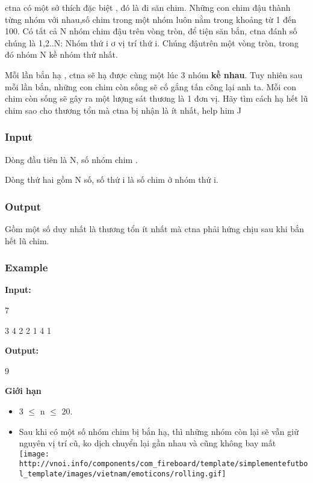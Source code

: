 

ctna có một sở thích đặc biệt , đó là đi săn chim. Những con chim đậu thành từng nhóm với nhau,số chim trong một nhóm luôn nằm trong khoảng từ 1 đến 100. Có tất cả N nhóm chim đậu trên vòng tròn, để tiện săn bắn, ctna đánh số chúng là 1,2..N: Nhóm thứ i ơ vị trí thứ i. Chúng đậutrên một vòng tròn, trong đó nhóm N kề nhóm thứ nhất.

Mỗi lần bắn hạ , ctna sẽ hạ được cùng một lúc 3 nhóm \textbf{ kề nhau}. Tuy nhiên sau mỗi lần bắn, những con chim còn sống sẽ cố gắng tấn công lại anh ta. Mỗi con chim còn sống sẽ gây ra một lượng sát thương là 1 đơn vị. Hãy tìm cách hạ hết lũ chim sao cho thương tổn mà ctna bị nhận là ít nhất, help him ^^

\subsubsection{Input}

Dòng đầu tiên là N, số nhóm chim .

Dòng thứ hai gồm N số, số thứ i là số chim ở nhóm thứ i.

\subsubsection{Output}

Gồm một số duy nhất là thương tổn ít nhất mà ctna phải hứng chịu sau khi bắn hết lũ chim.

\subsubsection{Example}

\textbf{Input:}


7


3 4 2 2 1 4 1

\textbf{Output:}


9








\textbf{Giới hạn}
\begin{itemize}
	\item 3  $\le$  n  $\le$  20.
	\item Sau khi có một số nhóm chim bị bắn hạ, thì những nhóm còn lại sẽ vẫn giữ nguyên vị trí cũ, ko dịch chuyển lại gần nhau và cũng không bay mất 
\texttt{[image: http://vnoi.info/components/com\_fireboard/template/simplementefutbol\_template/images/vietnam/emoticons/rolling.gif]}
\end{itemize}
